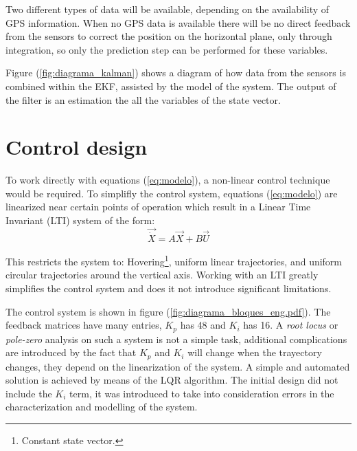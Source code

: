 \documentclass[conference]{IEEEtran}
\newcommand{\refp}[1]{(\ref{#1})}
\begin{document}
Two different types of data will be available, depending on the availability of GPS information. When no GPS data is available there will be no direct feedback from the sensors to correct the position on the horizontal plane, only through integration, so only the prediction step can be performed for these variables.


Figure \refp{fig:diagrama_kalman} shows a diagram of how data from the sensors is combined within the EKF, assisted by the model of the system. The output of the filter is an estimation the all the variables of the state vector.

\section{Control design}
\label{sec:control}

To work directly with equations \refp{eq:modelo}, a non-linear control technique would be required. To simplifly the control system, equations \refp{eq:modelo} are linearized near certain points of operation which result in a Linear Time Invariant (LTI) system of the form:
\begin{equation}
  \label{eq:lti}
  \vec{\dot{X}} = A\vec{X} + B\vec{U}
\end{equation}

This restricts the system to: Hovering\footnote{Constant state vector.}, uniform linear trajectories, and uniform circular trajectories around the vertical axis. Working with an LTI greatly simplifies the control system and does it not introduce significant limitations.

The control system is shown in figure (\ref{fig:diagrama_bloques_eng.pdf}). The feedback matrices have many entries, $K_p$ has 48 and $K_i$ has 16. A \textit{root locus} or \textit{pole-zero} analysis on such a system is not a simple task, additional complications are introduced by the fact that $K_p$ and $K_i$ will change when the trayectory changes, they depend on the linearization of the system. A simple and automated solution is achieved by means of the LQR algorithm. The initial design did not include the $K_i$ term, it was introduced to take into consideration errors in the characterization and modelling of the system.
\end{document}
